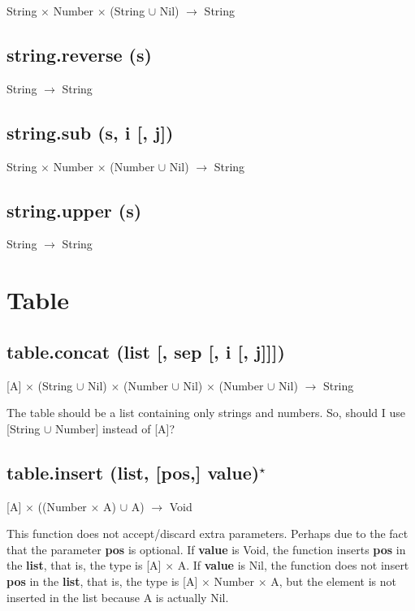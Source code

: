 \documentclass[12pt]{article}
\begin{document}
String $\times$
Number $\times$
(String $\cup$ Nil) $\rightarrow$
String

\subsection{string.reverse (s)}

String $\rightarrow$ String

\subsection{string.sub (s, i [, j])}

String $\times$
Number $\times$
(Number $\cup$ Nil) $\rightarrow$
String

\subsection{string.upper (s)}

String $\rightarrow$ String

\newpage

\section{Table}

\subsection{table.concat (list [, sep [, i [, j]]])}

[A] $\times$
(String $\cup$ Nil) $\times$
(Number $\cup$ Nil) $\times$
(Number $\cup$ Nil) $\rightarrow$
String

The table should be a list containing only strings and numbers.
So, should I use [String $\cup$ Number] instead of [A]?

\subsection{table.insert (list, [pos,] value)$^\star$}

[A] $\times$ ((Number $\times$ A) $\cup$ A) $\rightarrow$ Void

This function does not accept/discard extra parameters.
Perhaps due to the fact that the parameter \textbf{pos} is optional.
If \textbf{value} is Void, the function inserts \textbf{pos} in the
\textbf{list}, that is, the type is [A] $\times$ A.
If \textbf{value} is Nil, the function does not insert \textbf{pos}
in the \textbf{list}, that is, the type is
[A] $\times$ Number $\times$ A, but the element is not inserted in
the list because A is actually Nil.
\end{document}
